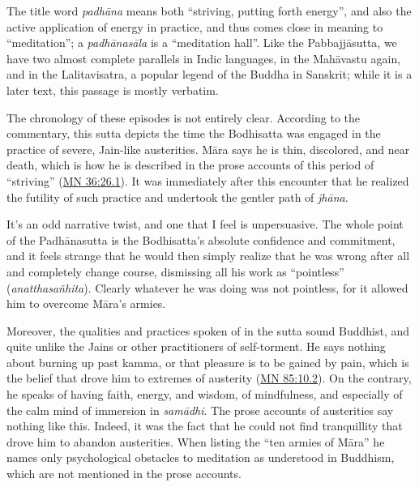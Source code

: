 \documentclass[12pt,openany]{book}%
\begin{document}
The title word \textit{\textsanskrit{padhāna}} means both “striving, putting forth energy”, and also the active application of energy in practice, and thus comes close in meaning to “meditation”; a \textit{\textsanskrit{padhānasāla}} is a “meditation hall”. Like the \textsanskrit{Pabbajjāsutta}, we have two almost complete parallels in Indic languages, in the \textsanskrit{Mahāvastu} again, and in the Lalitavisatra, a popular legend of the Buddha in Sanskrit; while it is a later text, this passage is mostly verbatim.

The chronology of these episodes is not entirely clear. According to the commentary, this sutta depicts the time the Bodhisatta was engaged in the practice of severe, Jain-like austerities. \textsanskrit{Māra} says he is thin, discolored, and near death, which is how he is described in the prose accounts of this period of “striving” (\href{https://suttacentral.net/mn36/en/sujato\#26.1}{MN 36:26.1}). It was immediately after this encounter that he realized the futility of such practice and undertook the gentler path of \textit{\textsanskrit{jhāna}}.

It’s an odd narrative twist, and one that I feel is unpersuasive. The whole point of the \textsanskrit{Padhānasutta} is the Bodhisatta’s absolute confidence and commitment, and it feels strange that he would then simply realize that he was wrong after all and completely change course, dismissing all his work as “pointless” (\textit{\textsanskrit{anatthasañhita}}). Clearly whatever he was doing was not pointless, for it allowed him to overcome \textsanskrit{Māra}’s armies.

Moreover, the qualities and practices spoken of in the sutta sound Buddhist, and quite unlike the Jains or other practitioners of self-torment. He says nothing about burning up past kamma, or that pleasure is to be gained by pain, which is the belief that drove him to extremes of austerity (\href{https://suttacentral.net/mn85/en/sujato\#10.2}{MN 85:10.2}). On the contrary, he speaks of having faith, energy, and wisdom, of mindfulness, and especially of the calm mind of immersion in \textit{\textsanskrit{samādhi}}. The prose accounts of austerities say nothing like this. Indeed, it was the fact that he could not find tranquillity that drove him to abandon austerities. When listing the “ten armies of \textsanskrit{Māra}” he names only psychological obstacles to meditation as understood in Buddhism, which are not mentioned in the prose accounts.
\end{document}
